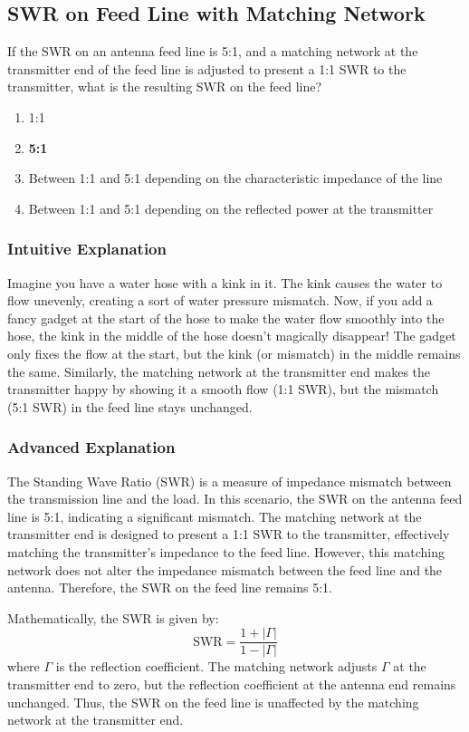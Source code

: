 \subsection{SWR on Feed Line with Matching Network}
\label{G9A08}

\begin{tcolorbox}[colback=gray!10!white,colframe=black!75!black,title=G9A08]
If the SWR on an antenna feed line is 5:1, and a matching network at the transmitter end of the feed line is adjusted to present a 1:1 SWR to the transmitter, what is the resulting SWR on the feed line?
\begin{enumerate}[label=\Alph*]
    \item 1:1
    \item \textbf{5:1}
    \item Between 1:1 and 5:1 depending on the characteristic impedance of the line
    \item Between 1:1 and 5:1 depending on the reflected power at the transmitter
\end{enumerate}
\end{tcolorbox}

\subsubsection{Intuitive Explanation}
Imagine you have a water hose with a kink in it. The kink causes the water to flow unevenly, creating a sort of water pressure mismatch. Now, if you add a fancy gadget at the start of the hose to make the water flow smoothly into the hose, the kink in the middle of the hose doesn't magically disappear! The gadget only fixes the flow at the start, but the kink (or mismatch) in the middle remains the same. Similarly, the matching network at the transmitter end makes the transmitter happy by showing it a smooth flow (1:1 SWR), but the mismatch (5:1 SWR) in the feed line stays unchanged.

\subsubsection{Advanced Explanation}
The Standing Wave Ratio (SWR) is a measure of impedance mismatch between the transmission line and the load. In this scenario, the SWR on the antenna feed line is 5:1, indicating a significant mismatch. The matching network at the transmitter end is designed to present a 1:1 SWR to the transmitter, effectively matching the transmitter's impedance to the feed line. However, this matching network does not alter the impedance mismatch between the feed line and the antenna. Therefore, the SWR on the feed line remains 5:1.

Mathematically, the SWR is given by:
\[
\text{SWR} = \frac{1 + |\Gamma|}{1 - |\Gamma|}
\]
where \(\Gamma\) is the reflection coefficient. The matching network adjusts \(\Gamma\) at the transmitter end to zero, but the reflection coefficient at the antenna end remains unchanged. Thus, the SWR on the feed line is unaffected by the matching network at the transmitter end.

